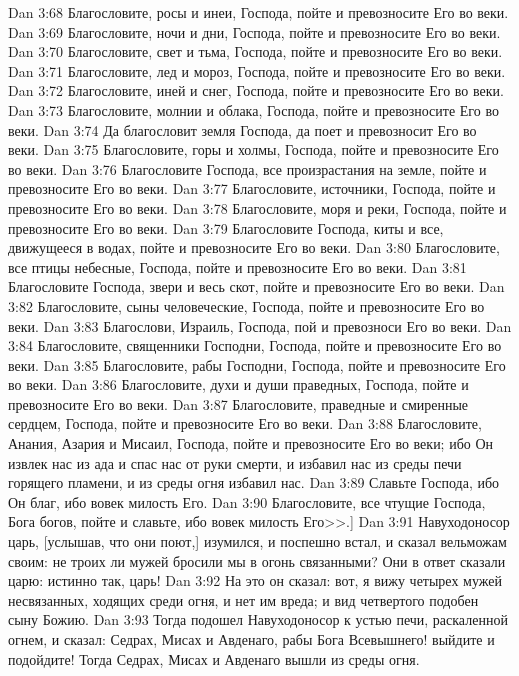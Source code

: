 \vs Dan 3:68 Благословите, росы и инеи, Господа, пойте и превозносите Его во веки.
\vs Dan 3:69 Благословите, ночи и дни, Господа, пойте и превозносите Его во веки.
\vs Dan 3:70 Благословите, свет и тьма, Господа, пойте и превозносите Его во веки.
\vs Dan 3:71 Благословите, лед и мороз, Господа, пойте и превозносите Его во веки.
\vs Dan 3:72 Благословите, иней и снег, Господа, пойте и превозносите Его во веки.
\vs Dan 3:73 Благословите, молнии и облака, Господа, пойте и превозносите Его во веки.
\vs Dan 3:74 Да благословит земля Господа, да поет и превозносит Его во веки.
\vs Dan 3:75 Благословите, горы и холмы, Господа, пойте и превозносите Его во веки.
\vs Dan 3:76 Благословите Господа, все произрастания на земле, пойте и превозносите Его во веки.
\vs Dan 3:77 Благословите, источники, Господа, пойте и превозносите Его во веки.
\vs Dan 3:78 Благословите, моря и реки, Господа, пойте и превозносите Его во веки.
\vs Dan 3:79 Благословите Господа, киты и все, движущееся в водах, пойте и превозносите Его во веки.
\vs Dan 3:80 Благословите, все птицы небесные, Господа, пойте и превозносите Его во веки.
\vs Dan 3:81 Благословите Господа, звери и весь скот, пойте и превозносите Его во веки.
\vs Dan 3:82 Благословите, сыны человеческие, Господа, пойте и превозносите Его во веки.
\vs Dan 3:83 Благослови, Израиль, Господа, пой и превозноси Его во веки.
\vs Dan 3:84 Благословите, священники Господни, Господа, пойте и превозносите Его во веки.
\vs Dan 3:85 Благословите, рабы Господни, Господа, пойте и превозносите Его во веки.
\vs Dan 3:86 Благословите, духи и души праведных, Господа, пойте и превозносите Его во веки.
\vs Dan 3:87 Благословите, праведные и смиренные сердцем, Господа, пойте и превозносите Его во веки.
\vs Dan 3:88 Благословите, Анания, Азария и Мисаил, Господа, пойте и превозносите Его во веки; ибо Он извлек нас из ада и спас нас от руки смерти, и избавил нас из среды печи горящего пламени, и из среды огня избавил нас.
\vs Dan 3:89 Славьте Господа, ибо Он благ, ибо вовек милость Его.
\vs Dan 3:90 Благословите, все чтущие Господа, Бога богов, пойте и славьте, ибо вовек милость Его>>.]
\rsbpar\vs Dan 3:91 Навуходоносор царь, [услышав, что они поют,] изумился, и поспешно встал, и сказал вельможам своим: не троих ли мужей бросили мы в огонь связанными? Они в ответ сказали царю: истинно так, царь!
\vs Dan 3:92 На это он сказал: вот, я вижу четырех мужей несвязанных, ходящих среди огня, и нет им вреда; и вид четвертого подобен сыну Божию.
\vs Dan 3:93 Тогда подошел Навуходоносор к устью печи, раскаленной огнем, и сказал: Седрах, Мисах и Авденаго, рабы Бога Всевышнего! выйдите и подойдите! Тогда Седрах, Мисах и Авденаго вышли из среды огня.
